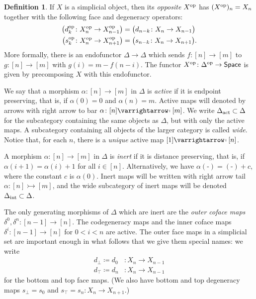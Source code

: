 \documentclass{amsart}
\theoremstyle{definition}
\newtheorem{definition}[theorem]{Definition}
\theoremstyle{remark}
\newcommand{\spaces}{\mathsf{Space}}
\newcommand{\op}{\textup{op}}
\newcommand{\actrm}{\textup{act}}
\newcommand{\intrm}{\textup{int}}
\newcommand{\delact}{\Delta_\actrm}
\newcommand{\delint}{\Delta_\intrm}
\newcommand{\ract}{\varrightarrow\mapsfromchar}
\newcommand{\rint}{\rightarrowtail}
\begin{document}
\begin{definition}
If $X$ is a simplicial object, then its \emph{opposite} $X^\op$ has $(X^\op)_n = X_n$ together with the following face and degeneracy operators: \begin{align*} \big( d_k^{\op} \colon X^\op_n \to X^\op_{n-1} \big) &= \big( d_{n-k} \colon X_n \to X_{n-1} \big)
\\
\big( s_k^{\op} \colon X^\op_n \to X^\op_{n+1} \big) &= \big( s_{n-k} \colon X_n \to X_{n+1} \big).
\end{align*}
More formally, there is an endofunctor $\Delta \to \Delta$ which sends $f \colon [n] \to [m]$ to $g \colon [n] \to [m]$ with $g(i) = m-f(n-i)$.
The functor $X^\op \colon \Delta^\op \to \spaces$ is given by precomposing $X$ with this endofunctor.
\end{definition}

We say that a morphism $\alpha \colon [n] \to [m]$ in $\Delta$ is \emph{active} if it is endpoint preserving, that is, if $\alpha(0) = 0$ and $\alpha(n) = m$.
Active maps will denoted by arrows with right arrow to bar %
$\alpha \colon [n] \ract [m]$.
We write $\delact \subset \Delta$ for the subcategory containing the same objects as $\Delta$, but with only the active maps.
A subcategory containing all objects of the larger category is called \emph{wide}.
Notice that, for each $n$, there is a \emph{unique} active map $[1] \ract [n]$.

A morphism $\alpha \colon [n] \to [m]$ in $\Delta$ is \emph{inert} if it is distance preserving, that is, if $\alpha(i+1) = \alpha(i) + 1$ for all $i\in [n]$.
Alternatively, we have $\alpha(\text{-}) = (\text{-}) + c$, where the constant $c$ is $\alpha(0)$.
Inert maps will be written with right arrow tail $\alpha \colon [n] \rint [m]$, and the wide subcategory of inert maps will be denoted $\delint \subset \Delta$.

The only generating morphisms of $\Delta$ which are inert are the \emph{outer coface maps} $\delta^0, \delta^{n} \colon [n-1] \to [n]$.
The codegeneracy maps and the inner coface maps $\delta^i \colon [n-1] \to [n]$ for $0 < i < n$ are active.
The outer face maps in a simplicial set are important enough in what follows that we give them special names: we write
\begin{align*}
  d_\bot \coloneqq d_0 &\colon X_n \to X_{n-1} \\
  d_\top \coloneqq d_n &\colon X_n \to X_{n-1}
\end{align*}
for the bottom and top face maps.
(We also have bottom and top degeneracy maps $s_\bot = s_0$ and $s_\top = s_n \colon X_n \to X_{n+1}$.)
\end{document}
